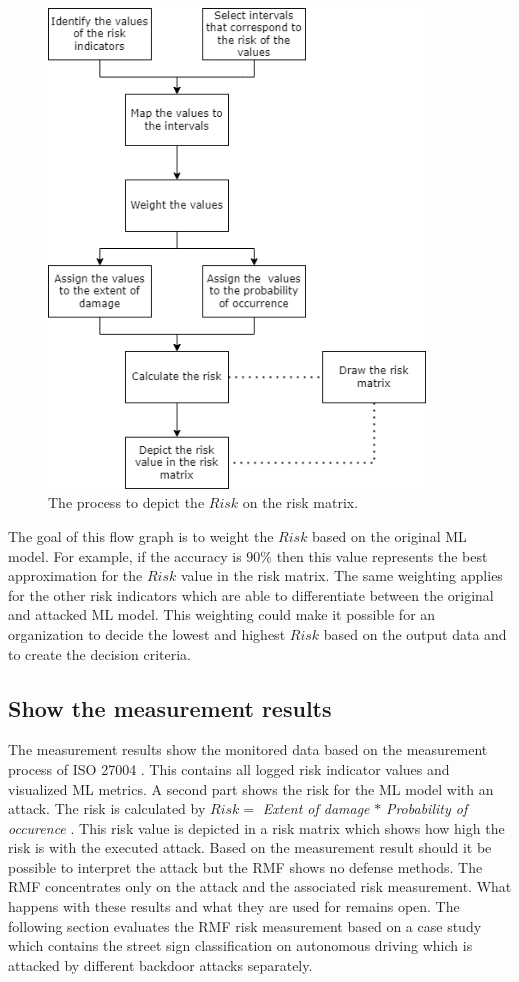 \begin{figure}[h!]
  \centering
  \includegraphics[width=10cm]{pictures/flow_graph.png}
  \caption{The process to depict the $Risk$ on the risk matrix.}
  \label{fig:flow_graph}
\end{figure}

The goal of this flow graph is to weight the $Risk$ based on the original ML model. For example, if the accuracy is $90\%$ then this value represents the best approximation for the $Risk$ value in the risk matrix. The same weighting applies for the other risk indicators which are able to differentiate between the original and attacked ML model. This weighting could make it possible for an organization to decide the lowest and highest $Risk$ based on the output data and to create the decision criteria.

\subsection{Show the measurement results}
\label{sec:impl_meas_res}

The measurement results show the monitored data based on the measurement process of ISO 27004 \cite{ISO_27004_2009}. This contains all logged risk indicator values and visualized ML metrics. A second part shows the risk for the ML model with an attack. The risk is calculated by $Risk = $ \textit{Extent of damage} $*$ \textit{Probability of occurence} \cite{DBLP:journals/access/JianxingHSH21}. This risk value is depicted in a risk matrix which shows how high the risk is with the executed attack. Based on the measurement result should it be possible to interpret the attack but the RMF shows no defense methods. The RMF concentrates only on the attack and the associated risk measurement. What happens with these results and what they are used for remains open. The following section evaluates the RMF risk measurement based on a case study which contains the street sign classification on autonomous driving which is attacked by different backdoor attacks separately.

